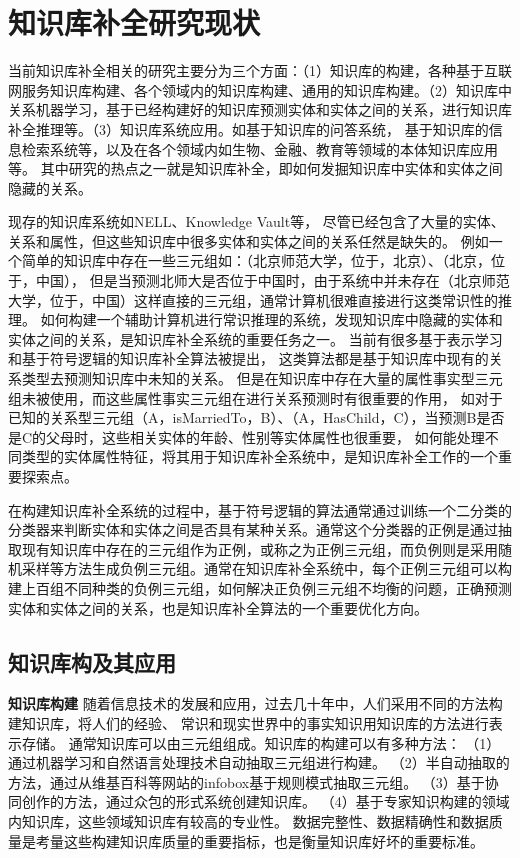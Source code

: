 

\chapter{知识库补全研究现状}
\label{cha:related-work}

当前知识库补全相关的研究主要分为三个方面：（1）知识库的构建，各种基于互联网服务知识库构建、各个领域内的知识库构建、通用的知识库构建。（2）知识库中关系机器学习，基于已经构建好的知识库预测实体和实体之间的关系，进行知识库补全推理等。（3）知识库系统应用。如基于知识库的问答系统，
基于知识库的信息检索系统等，以及在各个领域内如生物、金融、教育等领域的本体知识库应用等。
其中研究的热点之一就是知识库补全，即如何发掘知识库中实体和实体之间隐藏的关系。

现存的知识库系统如NELL、Knowledge Vault等，
尽管已经包含了大量的实体、关系和属性，但这些知识库中很多实体和实体之间的关系任然是缺失的。
例如一个简单的知识库中存在一些三元组如：（北京师范大学，位于，北京）、（北京，位于，中国），
但是当预测北师大是否位于中国时，由于系统中并未存在（北京师范大学，位于，中国）这样直接的三元组，通常计算机很难直接进行这类常识性的推理。
如何构建一个辅助计算机进行常识推理的系统，发现知识库中隐藏的实体和实体之间的关系，是知识库补全系统的重要任务之一。
当前有很多基于表示学习和基于符号逻辑的知识库补全算法被提出，
这类算法都是基于知识库中现有的关系类型去预测知识库中未知的关系。
但是在知识库中存在大量的属性事实型三元组未被使用，而这些属性事实三元组在进行关系预测时有很重要的作用，
如对于已知的关系型三元组（A，isMarriedTo，B）、（A，HasChild，C），当预测B是否是C的父母时，这些相关实体的年龄、性别等实体属性也很重要，
如何能处理不同类型的实体属性特征，将其用于知识库补全系统中，是知识库补全工作的一个重要探索点。

在构建知识库补全系统的过程中，基于符号逻辑的算法通常通过训练一个二分类的分类器来判断实体和实体之间是否具有某种关系。通常这个分类器的正例是通过抽取现有知识库中存在的三元组作为正例，或称之为正例三元组，而负例则是采用随机采样等方法生成负例三元组。通常在知识库补全系统中，每个正例三元组可以构建上百组不同种类的负例三元组，如何解决正负例三元组不均衡的问题，正确预测实体和实体之间的关系，也是知识库补全算法的一个重要优化方向。

\section{知识库构及其应用}

\textbf{知识库构建} 随着信息技术的发展和应用，过去几十年中，人们采用不同的方法构建知识库，将人们的经验、
常识和现实世界中的事实知识用知识库的方法进行表示存储。
通常知识库可以由三元组组成。知识库的构建可以有多种方法：
（1）通过机器学习和自然语言处理技术自动抽取三元组\cite{Weikum2010FromIT}进行构建。
（2）半自动抽取的方法，通过从维基百科等网站的infobox基于规则模式抽取三元组。
（3）基于协同创作\cite{Vrandecic2014WikidataAF}的方法，通过众包的形式系统创建知识库。
（4）基于专家知识构建的领域内知识库，这些领域知识库有较高的专业性。
数据完整性、数据精确性和数据质量是考量这些构建知识库质量的重要指标，也是衡量知识库好坏的重要标准。


